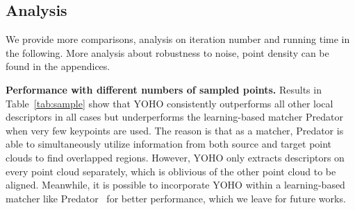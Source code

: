 \subsection{Analysis}
We provide more comparisons, analysis on iteration number and running time in the following. More analysis about robustness to noise, point density can be found in the appendices.


\begin{table}
\begin{center}
\end{center}
\caption{Ablation studies on the 3DMatch dataset. The ``Inv." means how to get rotation invariance. ``None" means no rotation invariance while ``Group" means average-pooling on icosahedral group features. ``GConv" means the proposed group convolution. ``CRV" means coarse rotation verification while ``OSE" means one-shot rotation estimation. }
\label{tab:ablation}
\vspace{-25pt}
\end{table}


\textbf{Performance with different numbers of sampled points.}
Results in Table~\ref{tab:sample} show that YOHO consistently outperforms all other local descriptors in all cases but underperforms the learning-based matcher Predator~\cite{predator} when very few keypoints are used. The reason is that as a matcher, Predator is able to simultaneously utilize information from both source and target point clouds to find overlapped regions. However, YOHO only extracts descriptors on every point cloud separately, which is oblivious of the other point cloud to be aligned. Meanwhile, it is possible to incorporate YOHO within a learning-based matcher like Predator~\cite{predator} for better performance, which we leave for future works.

